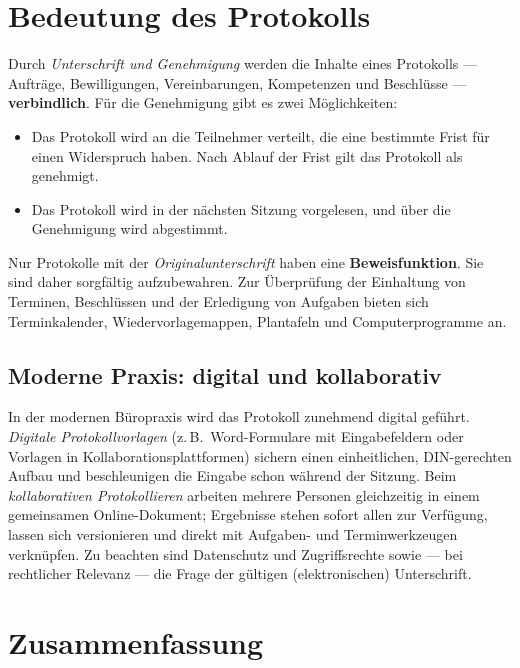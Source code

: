 \documentclass[11pt, a4paper]{article}
\begin{document}
\section{Bedeutung des Protokolls}

Durch \emph{Unterschrift und Genehmigung} werden die Inhalte eines Protokolls --- Aufträge,
Bewilligungen, Vereinbarungen, Kompetenzen und Beschlüsse --- \textbf{verbindlich}. Für die
Genehmigung gibt es zwei Möglichkeiten:

\begin{itemize}
  \item Das Protokoll wird an die Teilnehmer verteilt, die eine bestimmte Frist für einen Widerspruch haben. Nach Ablauf der Frist gilt das Protokoll als genehmigt.
  \item Das Protokoll wird in der nächsten Sitzung vorgelesen, und über die Genehmigung wird abgestimmt.
\end{itemize}

\begin{merksatz}
Nur Protokolle mit der \emph{Originalunterschrift} haben eine \textbf{Beweisfunktion}. Sie
sind daher sorgfältig aufzubewahren. Zur Überprüfung der Einhaltung von Terminen,
Beschlüssen und der Erledigung von Aufgaben bieten sich Terminkalender,
Wiedervorlagemappen, Plantafeln und Computerprogramme an.
\end{merksatz}

\subsection{Moderne Praxis: digital und kollaborativ}

In der modernen Büropraxis wird das Protokoll zunehmend digital geführt. \emph{Digitale
Protokollvorlagen} (z.\,B.\ Word-Formulare mit Eingabefeldern oder Vorlagen in
Kollaborationsplattformen) sichern einen einheitlichen, DIN-gerechten Aufbau und
beschleunigen die Eingabe schon während der Sitzung. Beim \emph{kollaborativen
Protokollieren} arbeiten mehrere Personen gleichzeitig in einem gemeinsamen
Online-Dokument; Ergebnisse stehen sofort allen zur Verfügung, lassen sich versionieren
und direkt mit Aufgaben- und Terminwerkzeugen verknüpfen. Zu beachten sind Datenschutz
und Zugriffsrechte sowie --- bei rechtlicher Relevanz --- die Frage der gültigen
(elektronischen) Unterschrift.

\section{Zusammenfassung}
\end{document}
